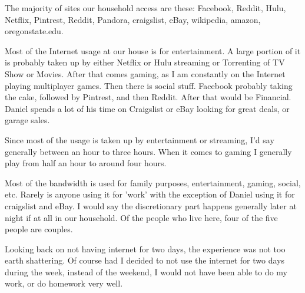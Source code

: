 \documentclass[12pt,letterpaper]{article}
\begin{document}
The majority of sites our household access are these: Facebook, Reddit,
Hulu, Netflix, Pintrest, Reddit, Pandora, craigslist, eBay, wikipedia,
amazon, oregonstate.edu.

Most of the Internet usage at our house is for entertainment. A large
portion of it is probably taken up by either Netflix or Hulu streaming
or Torrenting of TV Show or Movies. After that comes gaming, as I am
constantly on the Internet playing multiplayer games. Then there is
social stuff. Facebook probably taking the cake, followed by Pintrest,
and then Reddit. After that would be Financial. Daniel spends a lot of
his time on Craigslist or eBay looking for great deals, or garage sales.

Since most of the usage is taken up by entertainment or streaming, I'd
say generally between an hour to three hours. When it comes to gaming I
generally play from half an hour to around four hours.

Most of the bandwidth is used for family purposes, entertainment,
gaming, social, etc. Rarely is anyone using it for 'work' with the
exception of Daniel using it for craigslist and eBay. I would say the
discretionary part happens generally later at night if at all in our
household. Of the people who live here, four of the five people are
couples.


Looking back on not having internet for two days, the experience was not
too earth shattering. Of course had I decided to not use the internet
for two days during the week, instead of the weekend, I would not have
been able to do my work, or do homework very well.
\end{document}
